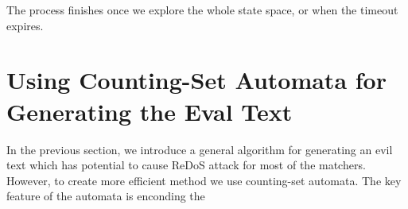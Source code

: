 \documentclass[acmsmall,screen]{acmart}
\begin{document}
The process finishes once we explore the whole state space, or when the timeout expires.
  



\section{Using Counting-Set Automata for Generating the Eval Text}\label{sec:genText}
In the previous section, we introduce a general algorithm for generating an evil text which has potential to cause ReDoS attack for most of the matchers. 
%
However, to create more efficient method we use counting-set automata.
%
The key feature of the automata is enconding the 
\end{document}
